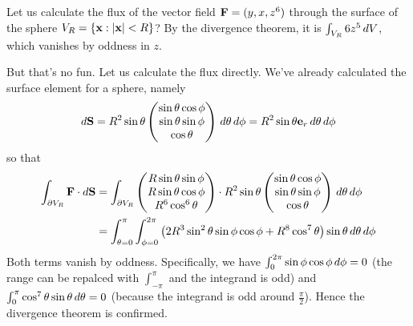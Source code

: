 \documentclass{../../template/note}
\begin{document}
    \begin{example*}
        Let us calculate the flux of the vector field \(\V F = (y, x, z^6)\) through the surface of the sphere \(V_R = \{\V x: |\V x| < R\}\)? By the divergence theorem, it is \(\int_{V_R} 6z^5 \,d{V}\), which vanishes by oddness in \(z\).

        But that's no fun. Let us calculate the flux directly. We've already calculated the surface element for a sphere, namely
        \begin{align*}
            d\V S = R^2 \sin \theta \begin{pmatrix}
             \sin \theta \cos \phi \\
             \sin \theta \sin \phi \\
             \cos \theta \\
            \end{pmatrix} \D \theta \D \phi = R^2 \sin \theta \V e_r \D \theta \D \phi
        \end{align*}
        so that
        \begin{align*}
            \int_{\pr V_R} \V F \cdot d \V S &= \int_{\pr V_R} \begin{pmatrix}
             R \sin \theta \sin \phi \\
             R \sin \theta \cos \phi \\
             R^6 \cos^6 \theta \\
            \end{pmatrix} \cdot R^2 \sin \theta \begin{pmatrix}
             \sin \theta \cos \phi \\
             \sin \theta \sin \phi \\
             \cos \theta \\
            \end{pmatrix} \D \theta \D \phi \\
            &= \int_{\theta=0}^{\pi} \int_{\phi=0}^{2\pi} \left(2R^3 \sin^2 \theta \sin \phi \cos \phi + R^8 \cos^7 \theta\right) \sin \theta \D \theta \D \phi
        \end{align*}
        Both terms vanish by oddness. Specifically, we have \(\int_0^{2\pi} \sin \phi \cos \phi \,d{\phi} = 0\) (the range can be repalced with \(\int_{-\pi}^{\pi}\) and the integrand is odd) and \(\int_0^{\pi} \cos^7 \theta \sin \theta \,d{\theta} = 0\) (because the integrand is odd around \(\frac{\pi}2\)). Hence the divergence theorem is confirmed.        
    \end{example*}
    
\end{document}
